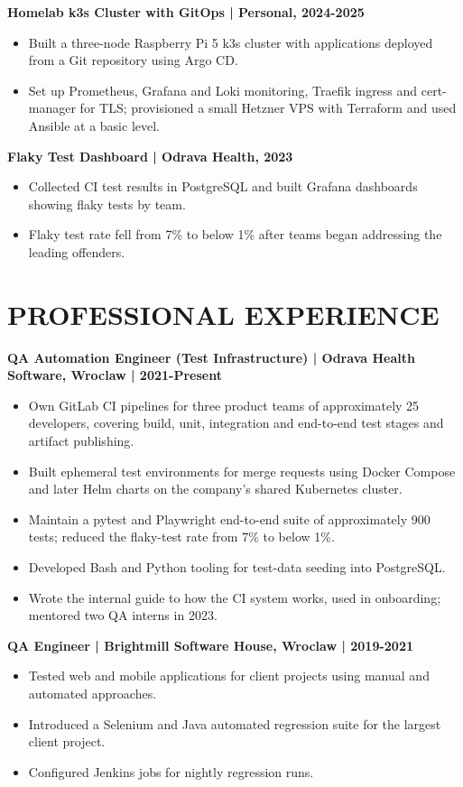 \documentclass[11pt,a4paper]{article}
\begin{document}
\textbf{Homelab k3s Cluster with GitOps | Personal, 2024-2025}
\begin{itemize}
\item Built a three-node Raspberry Pi 5 k3s cluster with applications deployed from a Git repository using Argo CD.
\item Set up Prometheus, Grafana and Loki monitoring, Traefik ingress and cert-manager for TLS; provisioned a small Hetzner VPS with Terraform and used Ansible at a basic level.
\end{itemize}

\textbf{Flaky Test Dashboard | Odrava Health, 2023}
\begin{itemize}
\item Collected CI test results in PostgreSQL and built Grafana dashboards showing flaky tests by team.
\item Flaky test rate fell from 7\% to below 1\% after teams began addressing the leading offenders.
\end{itemize}

\section*{PROFESSIONAL EXPERIENCE}
\textbf{QA Automation Engineer (Test Infrastructure) | Odrava Health Software, Wroclaw | 2021-Present}
\begin{itemize}
\item Own GitLab CI pipelines for three product teams of approximately 25 developers, covering build, unit, integration and end-to-end test stages and artifact publishing.
\item Built ephemeral test environments for merge requests using Docker Compose and later Helm charts on the company's shared Kubernetes cluster.
\item Maintain a pytest and Playwright end-to-end suite of approximately 900 tests; reduced the flaky-test rate from 7\% to below 1\%.
\item Developed Bash and Python tooling for test-data seeding into PostgreSQL.
\item Wrote the internal guide to how the CI system works, used in onboarding; mentored two QA interns in 2023.
\end{itemize}

\textbf{QA Engineer | Brightmill Software House, Wroclaw | 2019-2021}
\begin{itemize}
\item Tested web and mobile applications for client projects using manual and automated approaches.
\item Introduced a Selenium and Java automated regression suite for the largest client project.
\item Configured Jenkins jobs for nightly regression runs.
\end{itemize}
\end{document}
